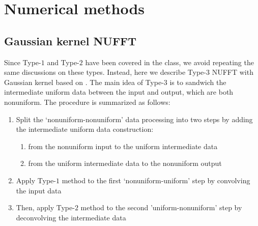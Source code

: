 \section{Numerical methods}

\subsection{Gaussian kernel NUFFT}
Since Type-$1$ and Type-$2$ have been covered in the class, we avoid repeating the same discussions on these types.
Instead, here we describe Type-$3$ NUFFT with Gaussian kernel based on \cite{JCP-2003-Greengard}.
The main idea of Type-$3$ is to sandwich the intermediate uniform data between the input and output, which are both nonuniform.
The procedure is summarized as follows:
\begin{enumerate}
  \item Split the `nonuniform-nonuniform' data processing into two steps
  by adding the intermediate uniform data construction:
  \begin{enumerate}
    \item from the nonuniform input to the uniform intermediate data
    \item from the uniform intermediate data to the nonuniform output
  \end{enumerate}
  \item Apply Type-$1$ method to the first `nonuniform-uniform' step by convolving the input data
  \item Then, apply Type-$2$ method to the second 'uniform-nonuniform' step by deconvolving the intermediate data
\end{enumerate}

